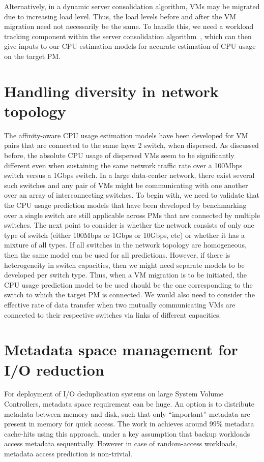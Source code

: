 Alternatively, in a dynamic server
consolidation algorithm, VMs may be migrated due to increasing load level.
Thus, the load levels before and after the VM migration need not
necessarily be the same. To handle this, we need a workload
tracking component within the server consolidation algorithm~\cite{sandpiper},
which can then give inputs to our CPU estimation models for
accurate estimation of CPU usage on the target PM.


\section{Handling diversity in network topology}
The affinity-aware CPU usage estimation models have been developed for
VM pairs that are connected to the same layer 2 switch, when dispersed.
As discussed before, the absolute CPU usage of dispersed VMs seem to
be significantly different even when sustaining the same network traffic
rate over a 100Mbps switch versus a 1Gbps switch. In a large data-center
network, there exist several such switches and any pair of VMs might
be communicating with one another over an array of interconnecting
switches. To begin with, we need to validate that the CPU usage prediction
models that have been developed by benchmarking over a single switch 
are still applicable across PMs that are connected by multiple 
switches. The next point to consider is whether the network 
consists of only one type of switch (either 100Mbps or 1Gbps or 10Gbps, etc)
or whether it has a mixture of all types. If all switches in 
the network topology are homogeneous, then the same model can be
used for all predictions. However, if there is heterogeneity in
switch capacities, then we might need separate models to be
developed per switch type. Thus, when a VM migration is to be
initiated, the CPU usage prediction model to be used should be
the one corresponding to the switch to which the target PM is connected.
We would also need to consider the effective rate of data transfer
when two mutually communicating VMs are connected to their respective
switches via links of different capacities.

\section{Metadata space management for I/O reduction}
For deployment of I/O deduplication systems
on large System Volume
Controllers, metadata space requirement can be huge.
An option is to distribute metadata between memory and disk, such that only
``important'' metadata are present in memory for quick
access. The work in \cite{data-domain} achieves around 99\%
metadata cache-hits using this approach, under a key assumption
that backup workloads access metadata sequentially.
However in case of random-access workloads,
metadata access prediction is non-trivial.

